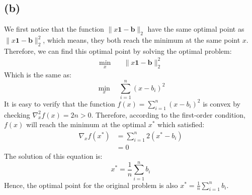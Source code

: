 \documentclass[10pt,a4paper]{article}
\begin{document}
\subsection*{(b)}
We first notice that the function $\| x \mathbf{1} - \mathbf{b} \|_{2}$ have the same optimal point as $\| x \mathbf{1} - \mathbf{b} \|_{2}^{2}$, which means, they both reach the minimum at the same point $x$. Therefore, we can find this optimal point by solving the optimal problem:
\begin{equation*}
	\begin{aligned}
		\displaystyle\min_{x} & \quad \| x \mathbf{1} - \mathbf{b} \|_{2}^{2}
	\end{aligned}
\end{equation*}
Which is the same as:
\begin{equation*}
	\displaystyle\min_{x} \quad \displaystyle\sum_{i = 1}^{n} (x - b_{i})^{2}
\end{equation*}
It is easy to verify that the function $f(x) = \displaystyle\sum_{i = 1}^{n} (x - b_{i})^{2}$ is convex by checking $\nabla^{2}_{x} f(x) = 2n > 0$. Therefore, according to the first-order condition, $f(x)$ will reach the minimum at the optimal $x^{*}$ which satisfied:
\begin{equation*}
	\begin{aligned}
		\nabla_{x}f(x^{*}) &= \displaystyle\sum_{i = 1}^{n}2(x^{*} - b_{i}) \\
		&= 0
	\end{aligned}
\end{equation*}
The solution of this equation is:
\begin{equation*}
	x^{*} = \frac{1}{n} \displaystyle\sum_{i = 1}^{n} b_{i}
\end{equation*}
Hence, the optimal point for the original problem is also $x^{*} = \frac{1}{n} \displaystyle\sum_{i = 1}^{n} b_{i}$.
\end{document}
